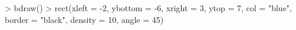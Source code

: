 \begin{Schunk}
\begin{Sinput}
> bdraw()
> rect(xleft = -2, ybottom = -6, xright = 3, ytop = 7, col = "blue", border = "black", density = 10, angle = 45)
\end{Sinput}
\end{Schunk}
